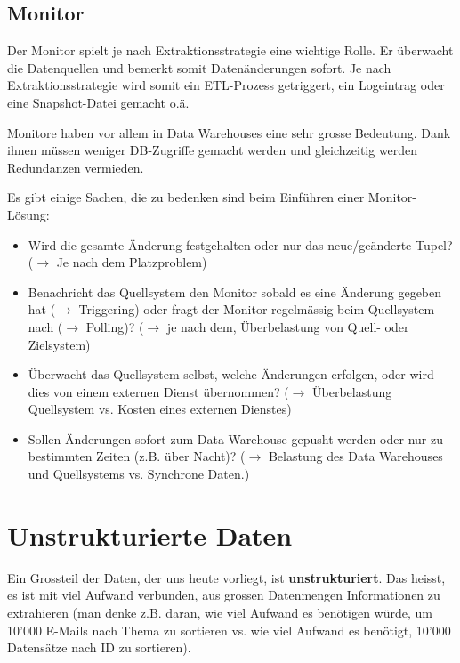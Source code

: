 \documentclass[a4paper, 11pt]{article}
\begin{document}
\subsection{Monitor}
Der Monitor spielt je nach Extraktionsstrategie eine wichtige Rolle. Er überwacht die Datenquellen und bemerkt somit Datenänderungen sofort. Je nach Extraktionsstrategie wird somit ein ETL-Prozess getriggert, ein Logeintrag oder eine Snapshot-Datei gemacht o.ä. 

Monitore haben vor allem in Data Warehouses eine sehr grosse Bedeutung. Dank ihnen müssen weniger DB-Zugriffe gemacht werden und gleichzeitig werden Redundanzen vermieden.

\vspace{10px}

\noindent Es gibt einige Sachen, die zu bedenken sind beim Einführen einer Monitor-Lösung:
\begin{itemize}
	\item Wird die gesamte Änderung festgehalten oder nur das neue/geänderte Tupel? ($\rightarrow$ Je nach dem Platzproblem)
	\item Benachricht das Quellsystem den Monitor sobald es eine Änderung gegeben hat ($\rightarrow$ Triggering) oder fragt der Monitor regelmässig beim Quellsystem nach ($\rightarrow$ Polling)? ($\rightarrow$ je nach dem, Überbelastung von Quell- oder Zielsystem)
	\item Überwacht das Quellsystem selbst, welche Änderungen erfolgen, oder wird dies von einem externen Dienst übernommen? ($\rightarrow$ Überbelastung Quellsystem vs. Kosten eines externen Dienstes)
	\item Sollen Änderungen sofort zum Data Warehouse gepusht werden oder nur zu bestimmten Zeiten (z.B. über Nacht)? ($\rightarrow$ Belastung des Data Warehouses und Quellsystems vs. Synchrone Daten.)
	
\end{itemize}

\newpage

\section{Unstrukturierte Daten}
Ein Grossteil der Daten, der uns heute vorliegt, ist \textbf{unstrukturiert}. Das heisst, es ist mit viel Aufwand verbunden, aus grossen Datenmengen Informationen zu extrahieren (man denke z.B. daran, wie viel Aufwand es benötigen würde, um 10'000 E-Mails nach Thema zu sortieren vs. wie viel Aufwand es benötigt, 10'000 Datensätze nach ID zu sortieren).
\end{document}
